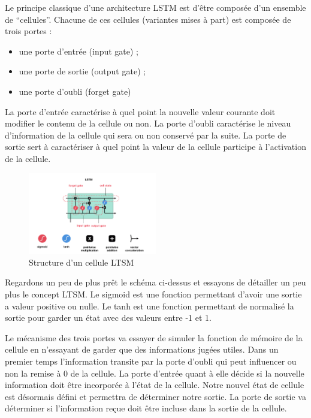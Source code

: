 \documentclass[8pt]{article}
\begin{document}
Le principe classique d'une architecture LSTM est d'être composée d'un
ensemble de ``cellules''. Chacune de ces cellules (variantes mises à
part) est composée de trois portes : 
\begin{itemize}
\item une porte d'entrée (input gate) ;
\item une porte de sortie (output gate) ; 
\item une porte d'oubli (forget gate)
\end{itemize}

La porte d'entrée caractérise à quel point la nouvelle valeur courante
doit modifier le contenu de la cellule ou non. La porte d'oubli
caractérise le niveau d'information de la cellule qui sera ou non
conservé par la suite. La porte de sortie sert à caractériser à quel
point la valeur de la cellule participe à l'activation de la cellule.

\begin{figure}
\centering
\includegraphics[width=0.5\textwidth]{1_0f8r3Vd-i4ueYND1CUrhMA.png}
\caption{Structure d'un cellule LTSM}
\end{figure}

    Regardons un peu de plus prêt le schéma ci-dessus et essayons de
détailler un peu plus le concept LTSM. Le sigmoid est une fonction
permettant d'avoir une sortie a valeur positive ou nulle. Le tanh est
une fonction permettant de normalisé la sortie pour garder un état avec
des valeurs entre -1 et 1.

Le mécanisme des trois portes va essayer de simuler la fonction de
mémoire de la cellule en n'essayant de garder que des informations
jugées utiles. Dans un premier temps l'information transite par la porte
d'oubli qui peut influencer ou non la remise à 0 de la cellule. La porte
d'entrée quant à elle décide si la nouvelle information doit être
incorporée à l'état de la cellule. Notre nouvel état de cellule est
désormais défini et permettra de déterminer notre sortie. La porte de
sortie va déterminer si l'information reçue doit être incluse dans la
sortie de la cellule.
\end{document}
